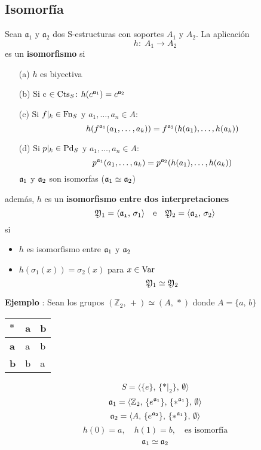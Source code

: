 \subsection{Isomorfía}
\begin{definition}
Sean $\mathfrak{a}_1$ y $\mathfrak{a}_2$ dos S-estructuras con soportes $A_1$ y $A_2$. La aplicación 
\[ h: \; A_1 \rightarrow A_2 \]
es un \textbf{isomorfismo} si 
\begin{itemize}
	\item[(a)] $h$ es biyectiva 
	\item[(b)] Si c $\in \mbox{Cts}_{S}$: $h(c^{\mathfrak{a}_1})=c^{\mathfrak{a}_2}$
	\item[(c)] Si $f\vert_{k} \in \mbox{Fn}_{S}$ y $a_1, \ldots, a_n \in A$:
	\[ h(f^{\mathfrak{a}_1}(a_1, \ldots, a_k))=f^{\mathfrak{a}_2}(h(a_1), \ldots, h(a_k)) \]
	\item[(d)] Si $p\vert_{k} \in \mbox{Pd}_{S}$ y $a_1, \ldots, a_n \in A$:
	\[ p^{\mathfrak{a}_1}(a_1, \ldots, a_k)=p^{\mathfrak{a}_2}(h(a_1), \ldots, h(a_k)) \]
	$\mathfrak{a}_1$ y $\mathfrak{a}_2$ son isomorfas ($\mathfrak{a}_1 \simeq \mathfrak{a}_2$)
\end{itemize} 
además, $h$ es un \textbf{isomorfismo entre dos interpretaciones} 
\[ \mathfrak{Y}_1=\langle \mathfrak{a_1}, \, \sigma_1 \rangle \quad \mbox{e} \quad \mathfrak{Y}_2=\langle \mathfrak{a_2}, \, \sigma_2 \rangle  \]
si
\begin{itemize}
	\item $h$ es isomorfismo entre $\mathfrak{a}_1$ y $\mathfrak{a}_2$ 
	\item $h(\sigma_1(x))=\sigma_2(x)$ para $x \in \mbox{Var}$
	\[ \mathfrak{Y}_1 \simeq \mathfrak{Y}_2  \]
\end{itemize}
\end{definition}

\addtocounter{ej}{1} %
\textbf{Ejemplo }: Sean los grupos $(\mathbb{Z}_2, \, +) \simeq (A, \, \ast)$ donde $A=\{a, \, b \}$ 

\begin{table}[h]
\centering
\begin{tabular}{l|l|l}
$\ast$ & \textbf{a} & \textbf{b} \\ \hline
\textbf{a}      & a & b \\ \hline
\textbf{b}      & b & a
\end{tabular}
\end{table}

\[ S= \langle \{e\}, \, \{ \ast\vert_{2}\},\, \emptyset \rangle  \]
\[ \mathfrak{a}_1= \langle \mathbb{Z}_2, \, \{ e^{\mathfrak{a}_1}\},\, \{\ast^{\mathfrak{a}_1}\}, \, \emptyset \rangle  \]
\[ \mathfrak{a}_2= \langle A, \, \{ e^{\mathfrak{a}_2}\},\, \{\ast^{\mathfrak{a}_1}\}, \, \emptyset \rangle  \]
\[ h(0)=a, \quad h(1)=b, \quad \mbox{es isomorfía} \]
\[ \mathfrak{a}_1 \simeq \mathfrak{a}_2 \]

